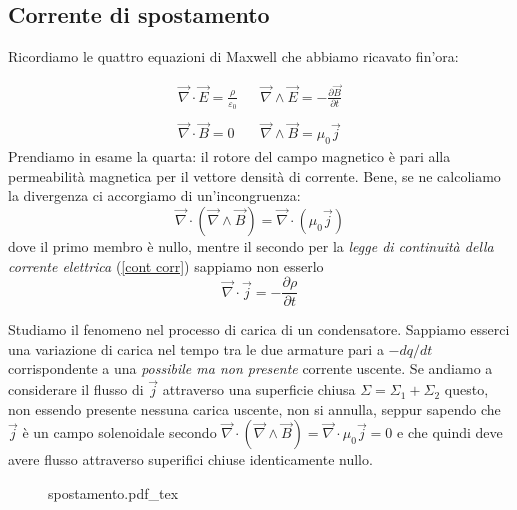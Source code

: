 \documentclass[x11names]{report}
\newcommand{\incfig}[1]{%
	{#1.pdf_tex}
}
\begin{document}
\subsection{Corrente di spostamento}
Ricordiamo le quattro equazioni di Maxwell che abbiamo ricavato fin'ora:

\[
\begin{array}{ccc}
	\vec{\nabla}\cdot \vec{E} = \frac{\rho}{\varepsilon_0} & & \vec{\nabla}\wedge \vec{E} = -\frac{\partial \vec{B}}{\partial t} \\ \\
	\vec{\nabla}\cdot \vec{B} = 0 & & \vec{\nabla}\wedge \vec{B} = \mu_0 \vec{j}
\end{array}
\]
Prendiamo in esame la quarta: il rotore del campo magnetico è pari alla permeabilità magnetica per il vettore densità di corrente. Bene, se ne calcoliamo la divergenza ci accorgiamo di un'incongruenza:
\[
\vec{\nabla}\cdot\left(\vec{\nabla}\wedge \vec{B}\right) = \vec{\nabla}\cdot\left(\mu_0 \vec{j}\right) 
\]
dove il primo membro è nullo, mentre il secondo per la \textit{legge di continuità della corrente elettrica} (\ref{cont corr}) sappiamo non esserlo
\[
\vec{\nabla}\cdot \vec{j} = - \frac{\partial \rho}{\partial t}
\]

Studiamo il fenomeno nel processo di carica di un condensatore. Sappiamo esserci una variazione di carica nel tempo tra le due armature pari a \(-dq/dt\) corrispondente a una \textit{possibile ma non presente} corrente uscente. Se andiamo a considerare il flusso di \(\vec{j}\) attraverso una superficie chiusa \(\Sigma = \Sigma_1 + \Sigma_2\) questo, non essendo presente nessuna carica uscente, non si annulla, seppur sapendo che \(\vec{j}\) è un campo solenoidale secondo \(\vec{\nabla}\cdot\left(\vec{\nabla}\wedge \vec{B}\right) = \vec{\nabla}\cdot\mu_0 \vec{j} = 0\) e che quindi deve avere flusso attraverso superifici chiuse identicamente nullo.


\begin{figure}[H]
	\centering
	\incfig{spostamento}
\end{figure}
\end{document}
